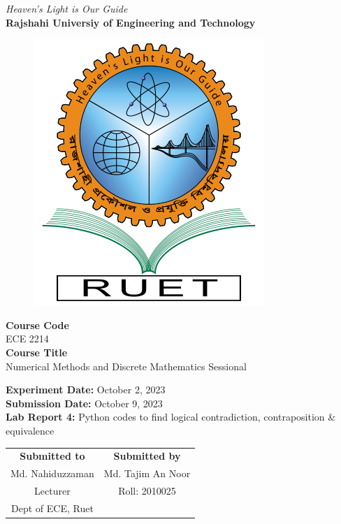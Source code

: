 \vspace*{\fill}
\begin{center}

    \emph{Heaven's Light is Our Guide} \\
    \textbf{Rajshahi Universiy of Engineering and Technology} \\

    \begin{figure}[h]
        \centering
        \includegraphics[scale=.34]{images/RUET_logo.png}
        \label{fig:ruet_logo}
    \end{figure}
    \vspace{5mm}

    \textbf{Course Code}\\
    ECE 2214\\
    \vspace{3mm}
    \textbf{Course Title}\\
    Numerical Methods and Discrete Mathematics Sessional

    \vspace{5mm}
    \textbf{Experiment Date:} October 2, 2023\\
    \textbf{Submission Date:} {October 9, 2023}\\

    \vspace{5mm}
    \textbf{Lab Report 4:} Python codes to find logical contradiction, contraposition \& equivalence\\

    \vspace{15mm}

    \begin{tabular}{c|c}
        \textbf{Submitted to} & \textbf{Submitted by} \\
        Md. Nahiduzzaman      & Md. Tajim An Noor     \\
        Lecturer              & Roll: 2010025         \\
        Dept of ECE, Ruet     &                       \\
    \end{tabular}

\end{center}
\vspace*{\fill}

